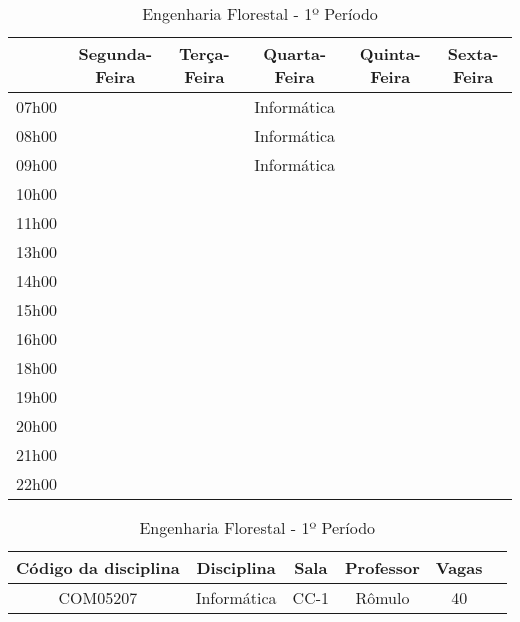\begin{apendices}
\begin{table}[!h]
\begin{adjustbox}{width=1\textwidth,center=\textwidth}
\centering
\begin{tabular}{|c|c|c|c|c|c|}
\hline
 & Segunda-Feira & Terça-Feira & Quarta-Feira & Quinta-Feira & Sexta-Feira \\ \hline
07h00 &  &  & Informática &  &  \\ \hline
08h00 &  &  & Informática &  &  \\ \hline
09h00 &  &  & Informática &  &  \\ \hline
10h00 &  &  &  &  &  \\ \hline
11h00 &  &  &  &  &  \\ \hline
13h00 &  &  &  &  &  \\ \hline
14h00 &  &  &  &  &  \\ \hline
15h00 &  &  &  &  &  \\ \hline
16h00 &  &  &  &  &  \\ \hline
18h00 &  &  &  &  &  \\ \hline
19h00 &  &  &  &  &  \\ \hline
20h00 &  &  &  &  &  \\ \hline
21h00 &  &  &  &  &  \\ \hline
22h00 &  &  &  &  &  \\ \hline

\end{tabular}
\end{adjustbox}
\begin{adjustbox}{width=1\textwidth,center=\textwidth}
\centering
\begin{tabular}{|c|c|c|c|c|c|}
\hline
\textbf{Código da disciplina} & \textbf{Disciplina} & \textbf{Sala} & \textbf{Professor} & \textbf{Vagas} \\ \hline
COM05207 & Informática & CC-1 & Rômulo & 40 \\ \hline

\end{tabular}
\end{adjustbox}
\caption{Engenharia Florestal - 1º Período}
\end{table}




\end{apendices}
